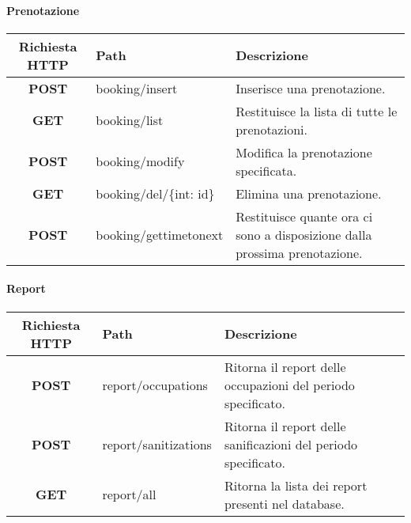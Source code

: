\paragraph{Prenotazione}
\begin{center}
	\begin{longtable}{|c|p{7cm}|p{5cm}|}
		\hline
		\rowcolor{lighter-grayer}
		\textbf{Richiesta HTTP} & \textbf{Path} & \textbf{Descrizione}\\		
		\hline
		\endfirsthead
		\textbf{POST} & booking/insert & Inserisce una prenotazione.\\
		\hline
		\textbf{GET} & booking/list & Restituisce la lista di tutte le prenotazioni.\\
		\hline
		\textbf{POST} & booking/modify & Modifica la prenotazione specificata.\\
		\hline
		\textbf{GET} & booking/del/\{int: id\} & Elimina una prenotazione.\\
		\hline
		\textbf{POST} & booking/gettimetonext & Restituisce quante ora ci sono a disposizione dalla prossima prenotazione.\\
		\hline
	\end{longtable}
\end{center}
\paragraph{Report}
\begin{center}
	\begin{longtable}{|c|p{7cm}|p{5cm}|}
		\hline
		\rowcolor{lighter-grayer}
		\textbf{Richiesta HTTP} & \textbf{Path} & \textbf{Descrizione}\\		
		\hline
		\endfirsthead
		\textbf{POST} & report/occupations & Ritorna il report delle occupazioni del periodo specificato.\\
		\hline
		\textbf{POST} & report/sanitizations & Ritorna il report delle sanificazioni del periodo specificato.\\
		\hline
		\textbf{GET} & report/all & Ritorna la lista dei report presenti nel database.\\
		\hline
	\end{longtable}
\end{center}
